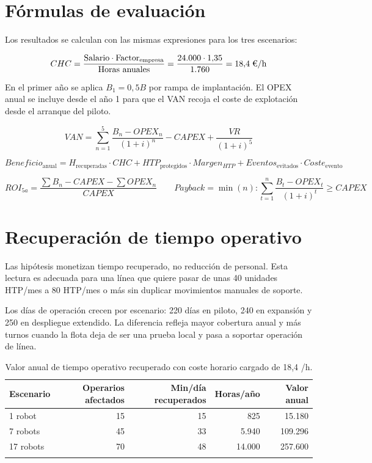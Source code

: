 \section{Fórmulas de evaluación}

Los resultados se calculan con las mismas expresiones para los tres escenarios:

\[
CHC=\frac{\text{Salario}\cdot \text{Factor}_{\mathrm{empresa}}}{\text{Horas anuales}}
=\frac{24.000\cdot 1{,}35}{1.760}=18{,}4\;\text{\texteuro{}/h}
\]

En el primer año se aplica \(B_1=0{,}5B\) por rampa de implantación. El OPEX anual se incluye desde el año 1 para que el VAN recoja el coste de explotación desde el arranque del piloto.

\[
VAN=\sum_{n=1}^{5}\frac{B_n-OPEX_n}{(1+i)^n}-CAPEX+\frac{VR}{(1+i)^5}
\]

\[
Beneficio_{\mathrm{anual}}=
H_{\mathrm{recuperadas}}\cdot CHC+
HTP_{\mathrm{protegidos}}\cdot Margen_{HTP}+
Eventos_{\mathrm{evitados}}\cdot Coste_{\mathrm{evento}}
\]

\[
ROI_{5a}=\frac{\sum B_n-CAPEX-\sum OPEX_n}{CAPEX}
\qquad
Payback=\min(n):\sum_{t=1}^{n}\frac{B_t-OPEX_t}{(1+i)^t}\geq CAPEX
\]

\section{Recuperación de tiempo operativo}

Las hipótesis monetizan tiempo recuperado, no reducción de personal. Esta lectura es adecuada para una línea que quiere pasar de unas 40 unidades HTP/mes a 80 HTP/mes o más sin duplicar movimientos manuales de soporte.

Los días de operación crecen por escenario: 220 días en piloto, 240 en expansión y 250 en despliegue extendido. La diferencia refleja mayor cobertura anual y más turnos cuando la flota deja de ser una prueba local y pasa a soportar operación de línea.

\begin{longtable}{P{0.18\textwidth}r r r r}
\toprule
Escenario & Operarios afectados & Min/día recuperados & Horas/año & Valor anual\\
\midrule
{} robot & 15 & 15 & 825 & 15.180 \texteuro{}\\
7 robots & 45 & 33 & 5.940 & 109.296 \texteuro{}\\
17 robots & 70 & 48 & 14.000 & 257.600 \texteuro{}\\
\bottomrule
\caption{Valor anual de tiempo operativo recuperado con coste horario cargado de 18,4 \texteuro{}/h.}
\label{tab:roi-tiempo}
\end{longtable}

